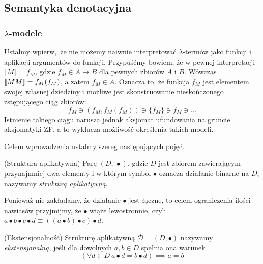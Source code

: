 \subsection{Semantyka denotacyjna}


\subsubsection{\(\lambda\)-modele}\label{subsec:lambda-models}
Ustalmy wpierw, że nie możemy naiwnie interpretować \(\lambda\)-termów jako funkcji i aplikacji argumentów do funkcji. Przypuśćmy bowiem, że w pewnej interpretacji \(\llbracket M \rrbracket=f_M\), gdzie \(f_M \in A\to B\) dla pewnych zbiorów \(A\) i \(B\). Wówczas \(\llbracket M M\rrbracket=\nobreak f_M(f_M)\), a zatem \(f_M\in A\). Oznacza to, że funkcja \(f_M\) jest elementem swojej własnej dziedziny i możliwe jest skonstruowanie nieskończonego zstępującego ciąg zbiorów:
\[
  f_M \ni \left(f_M, f_M\left(f_M\right)\right)  \ni\{f_M\} \ni f_M \ni \dots
\]
Istnienie takiego ciągu narusza jednak aksjomat ufundowania na gruncie aksjomatyki ZF, a to wyklucza możliwość określenia takich modeli.

Celem wprowadzenia ustalmy szereg następujących pojęć.

\begin{definicja}\label{def:app-structure}(Struktura aplikatywna) 
Parę \((D,\, \bullet)\), gdzie \(D\) jest zbiorem zawierającym przynajmniej dwa elementy i w którym symbol \(\bullet\) oznacza działanie binarne na \(D\), nazywamy \emph{strukturą aplikatywną}.
\end{definicja}
\begin{konwencja*}
  Ponieważ nie zakładamy, że działanie \(\bullet\) jest łączne, to celem ograniczenia ilości nawiasów przyjmijmy, że \(\bullet\) wiąże lewostronnie, czyli \(a\bullet b\bullet c\bullet d \equiv \left(\left(a\bullet b\right)\bullet c\right)\bullet d\).
\end{konwencja*}

\begin{definicja}\label{def:extens-struct}(Ekstensjonalność)
  Strukturę aplikatywną \(\mathcal{D}=(D,\bullet)\) nazywamy \emph{ekstensjonalną}, jeśli dla dowolnych \(a, b\in D\) spełnia ona warunek
  \[ (\forall d\in D\ a \bullet d = b \bullet d) \implies a = b \]
\end{definicja}

